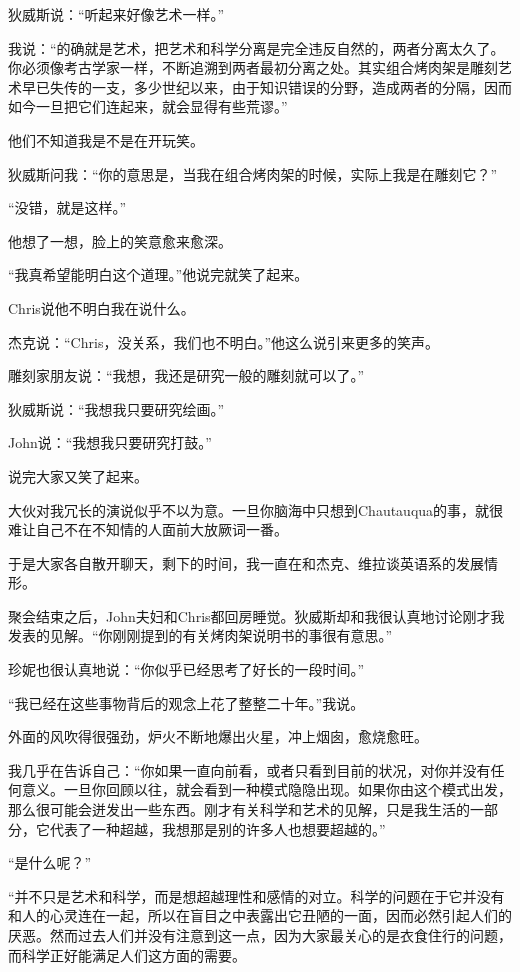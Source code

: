 \documentclass[UTF8]{article}
\begin{document}
\par 狄威斯说：“听起来好像艺术一样。”
\par 我说：“的确就是艺术，把艺术和科学分离是完全违反自然的，两者分离太久了。你必须像考古学家一样，不断追溯到两者最初分离之处。其实组合烤肉架是雕刻艺术早已失传的一支，多少世纪以来，由于知识错误的分野，造成两者的分隔，因而如今一旦把它们连起来，就会显得有些荒谬。”
\par 他们不知道我是不是在开玩笑。
\par 狄威斯问我：“你的意思是，当我在组合烤肉架的时候，实际上我是在雕刻它？”
\par “没错，就是这样。”
\par 他想了一想，脸上的笑意愈来愈深。
\par “我真希望能明白这个道理。”他说完就笑了起来。
\par Chris说他不明白我在说什么。
\par 杰克说：“Chris，没关系，我们也不明白。”他这么说引来更多的笑声。
\par 雕刻家朋友说：“我想，我还是研究一般的雕刻就可以了。”
\par 狄威斯说：“我想我只要研究绘画。”
\par John说：“我想我只要研究打鼓。”
\par 说完大家又笑了起来。
\par 大伙对我冗长的演说似乎不以为意。一旦你脑海中只想到Chautauqua的事，就很难让自己不在不知情的人面前大放厥词一番。
\par 于是大家各自散开聊天，剩下的时间，我一直在和杰克、维拉谈英语系的发展情形。
\par 聚会结束之后，John夫妇和Chris都回房睡觉。狄威斯却和我很认真地讨论刚才我发表的见解。“你刚刚提到的有关烤肉架说明书的事很有意思。”
\par 珍妮也很认真地说：“你似乎已经思考了好长的一段时间。”
\par “我已经在这些事物背后的观念上花了整整二十年。”我说。
\par 外面的风吹得很强劲，炉火不断地爆出火星，冲上烟囱，愈烧愈旺。
\par 我几乎在告诉自己：“你如果一直向前看，或者只看到目前的状况，对你并没有任何意义。一旦你回顾以往，就会看到一种模式隐隐出现。如果你由这个模式出发，那么很可能会迸发出一些东西。刚才有关科学和艺术的见解，只是我生活的一部分，它代表了一种超越，我想那是别的许多人也想要超越的。”
\par “是什么呢？”
\par “并不只是艺术和科学，而是想超越理性和感情的对立。科学的问题在于它并没有和人的心灵连在一起，所以在盲目之中表露出它丑陋的一面，因而必然引起人们的厌恶。然而过去人们并没有注意到这一点，因为大家最关心的是衣食住行的问题，而科学正好能满足人们这方面的需要。
\end{document}
